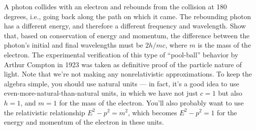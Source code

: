 A photon collides with an electron and rebounds from the
collision at 180 degrees, i.e., going back along the path on
which it came. The rebounding photon has a different energy,
and therefore a different frequency and wavelength. Show
that, based on conservation of energy and momentum, the
difference between the photon's initial and final wavelengths
must be $2h/mc$, where $m$ is the mass of the
electron. The experimental verification of this type of
``pool-ball'' behavior by Arthur Compton in 1923 was taken
as definitive proof of the particle nature of light. Note that
we're not making any nonrelativistic approximations. To keep the
algebra simple, you should use natural units --- in fact, it's a good
idea to use even-more-natural-than-natural units, in which we have
not just $c=1$ but also $h=1$, and $m=1$ for the mass of the electron.
You'll also probably want to use the relativistic relationship $E^2-p^2=m^2$,
which becomes $E^2-p^2=1$ for the energy and momentum of the electron in
these units.
